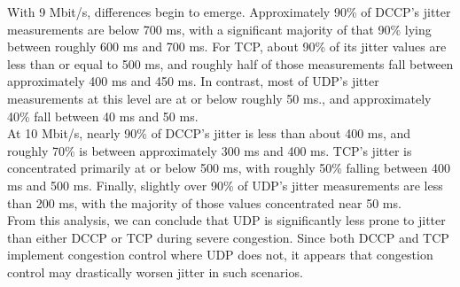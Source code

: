 \documentclass[9pt,twocolumn]{article}
\begin{document}
With 9 Mbit/s, differences begin to emerge. Approximately 90\% of DCCP's jitter
measurements are below 700 ms, with a significant majority of that 90\% lying
between roughly 600 ms and 700 ms. For TCP, about 90\% of its jitter values are
less than or equal to 500 ms, and roughly half of those measurements fall
between approximately 400 ms and 450 ms. In contrast, most of UDP's jitter
measurements at this level are at or below roughly 50 ms., and approximately
40\% fall between 40 ms and 50 ms.\\

At 10 Mbit/s, nearly 90\% of DCCP's jitter is less than about 400 ms, and
roughly 70\% is between approximately 300 ms and 400 ms. TCP's jitter is
concentrated primarily at or below 500 ms, with roughly 50\% falling between 400
ms and 500 ms. Finally, slightly over 90\% of UDP's jitter measurements are less
than 200 ms, with the majority of those values concentrated near 50 ms.\\

From this analysis, we can conclude that UDP is significantly less prone to
jitter than either DCCP or TCP during severe congestion. Since both DCCP and TCP
implement congestion control where UDP does not, it appears that congestion
control may drastically worsen jitter in such scenarios.\\
\end{document}
